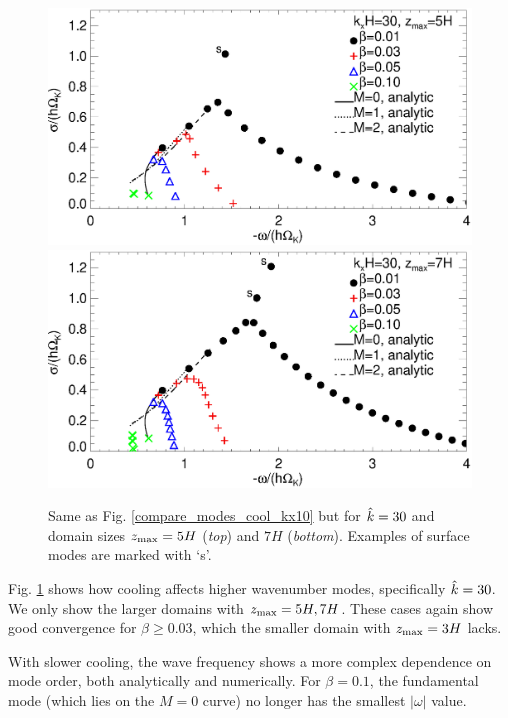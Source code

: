 \begin{figure}
  \includegraphics[width=\linewidth,clip=true,trim=0cm 1.75cm 0cm
  0cm]{figures/compare_modes_cool_kx30_z5_analytic.ps}
  \includegraphics[width=\linewidth]{figures/compare_modes_cool_kx30_z7_analytic.ps}
  \caption{Same as Fig. \ref{compare_modes_cool_kx10} but for
    $\hat{k}=30$ and domain sizes $z_\mathrm{max} = 5H$ (\emph{top}) and $7H$ (\emph{bottom}). Examples of surface modes are marked with `s'. 
    \label{compare_modes_cool_kx30} 
  }
\end{figure}

Fig. \ref{compare_modes_cool_kx30} shows how cooling affects higher wavenumber
modes, specifically $\hat{k}=30$.   We only show the larger domains with $z_\mathrm{max} = 5H, 7H$. 
These cases again show good convergence for $\beta \geq 0.03$, which 
the smaller domain with  $z_\mathrm{max} = 3H$ lacks.

With slower cooling, the wave frequency shows a more complex 
dependence on mode order, both analytically and numerically. For $\beta = 0.1$,
 the fundamental mode (which lies on the $M = 0$ curve) no longer has the smallest $|\omega|$ value.  

